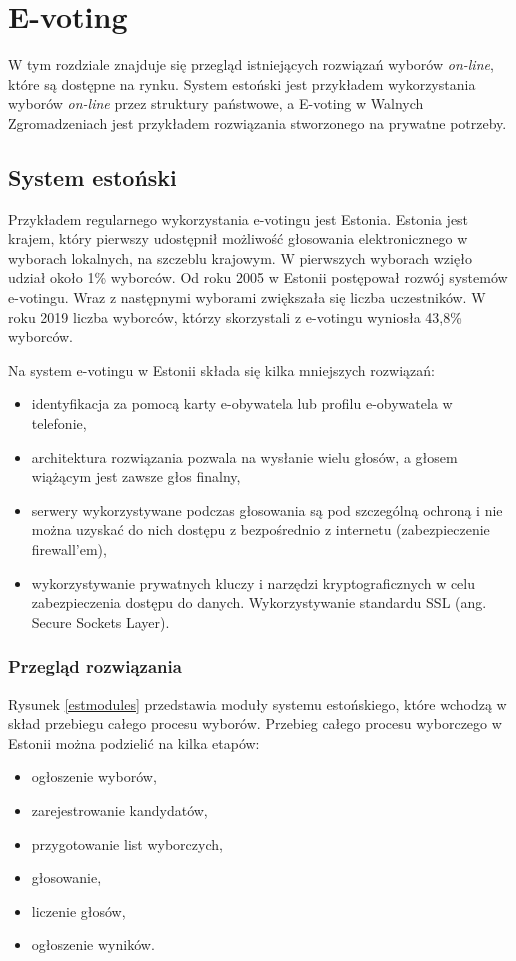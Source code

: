 \documentclass[a4paper,12pt]{book}
\begin{document}
\newpage

\chapter{E-voting}
W tym rozdziale znajduje się przegląd istniejących rozwiązań wyborów \textit{on-line}, które są dostępne na rynku. System estoński jest przykładem wykorzystania wyborów \textit{on-line} przez struktury państwowe, a E-voting w Walnych Zgromadzeniach jest przykładem rozwiązania stworzonego na prywatne potrzeby.

\section{System estoński}
Przykładem regularnego wykorzystania e-votingu jest Estonia. Estonia jest krajem, który pierwszy udostępnił możliwość głosowania elektronicznego w wyborach lokalnych, na szczeblu krajowym. W pierwszych wyborach wzięło udział około 1\% wyborców. Od roku 2005 w Estonii postępował rozwój systemów e-votingu. Wraz z następnymi wyborami zwiększała się liczba uczestników. W roku 2019 liczba wyborców, którzy skorzystali z e-votingu wyniosła 43,8\% wyborców.

Na system e-votingu w Estonii składa się kilka mniejszych rozwiązań:
\begin{itemize}

\item identyfikacja za pomocą karty e-obywatela lub profilu e-obywatela w telefonie,

\item architektura rozwiązania pozwala na wysłanie wielu głosów, a głosem wiążącym jest zawsze głos finalny,

\item serwery wykorzystywane podczas głosowania są pod szczególną ochroną i nie można uzyskać do nich dostępu z bezpośrednio z internetu (zabezpieczenie firewall'em),

\item wykorzystywanie prywatnych kluczy i narzędzi kryptograficznych w celu zabezpieczenia dostępu do danych. Wykorzystywanie standardu SSL (ang. Secure Sockets Layer).
\end{itemize}

\subsection{Przegląd rozwiązania}
Rysunek \ref{estmodules} przedstawia moduły systemu estońskiego, które wchodzą w skład przebiegu całego procesu wyborów. Przebieg całego procesu wyborczego w Estonii można podzielić na kilka etapów:
\begin{itemize}
\item ogłoszenie wyborów,
\item zarejestrowanie kandydatów,
\item przygotowanie list wyborczych,
\item głosowanie,
\item liczenie głosów,
\item ogłoszenie wyników.
\end{itemize}
\end{document}
